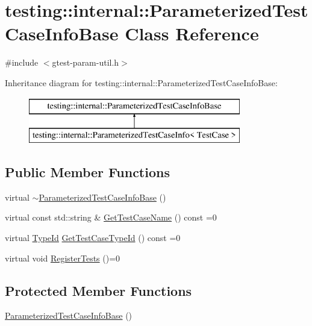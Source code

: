 \hypertarget{classtesting_1_1internal_1_1_parameterized_test_case_info_base}{}\section{testing\+::internal\+::Parameterized\+Test\+Case\+Info\+Base Class Reference}
\label{classtesting_1_1internal_1_1_parameterized_test_case_info_base}


{\ttfamily \#include $<$gtest-\/param-\/util.\+h$>$}

Inheritance diagram for testing\+::internal\+::Parameterized\+Test\+Case\+Info\+Base\+:\begin{figure}[H]
\begin{center}
\leavevmode
\includegraphics[height=2.000000cm]{da/da0/classtesting_1_1internal_1_1_parameterized_test_case_info_base}
\end{center}
\end{figure}
\subsection*{Public Member Functions}
\begin{DoxyCompactItemize}
\item 
virtual \mbox{\hyperlink{classtesting_1_1internal_1_1_parameterized_test_case_info_base_affae85e908f0901a8f0f1f9576843e35}{$\sim$\+Parameterized\+Test\+Case\+Info\+Base}} ()
\item 
virtual const std\+::string \& \mbox{\hyperlink{classtesting_1_1internal_1_1_parameterized_test_case_info_base_ac69b3bc29debfd6d891b7f5b2d088b1c}{Get\+Test\+Case\+Name}} () const =0
\item 
virtual \mbox{\hyperlink{namespacetesting_1_1internal_a38c435cbab5f8b784e2e7f3356cab242}{Type\+Id}} \mbox{\hyperlink{classtesting_1_1internal_1_1_parameterized_test_case_info_base_a932b4a9185a72d5bdfa5fd84fc06cbca}{Get\+Test\+Case\+Type\+Id}} () const =0
\item 
virtual void \mbox{\hyperlink{classtesting_1_1internal_1_1_parameterized_test_case_info_base_a92baca6c64c822c2e7043217f7903ef2}{Register\+Tests}} ()=0
\end{DoxyCompactItemize}
\subsection*{Protected Member Functions}
\begin{DoxyCompactItemize}
\item 
\mbox{\hyperlink{classtesting_1_1internal_1_1_parameterized_test_case_info_base_a48d0d6c661d0d5b6b404f1add3704aaf}{Parameterized\+Test\+Case\+Info\+Base}} ()
\end{DoxyCompactItemize}
